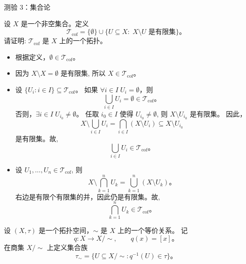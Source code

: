 
\begin{frame}[allowframebreaks]{测验 3：集合论}

\begin{problem}
  设 $X$ 是一个非空集合。定义
  \[
    \mathcal{T}_{\mathrm{cof}} =
    \{\emptyset\} \cup \{U \subseteq X:\;
      X \setminus U \text{ 是有限集}\}\text{。}
  \]
  请证明: $\mathcal{T}_{\mathrm{cof}}$ 是 $X$ 上的一个拓扑。
\end{problem}

\begin{solution}
  \begin{itemize}
    \item 根据定义，$\emptyset\in \mathcal{T}_{\mathrm{cof}}$。
    \item 因为 $X \setminus X = \emptyset$ 是有限集,
      所以 $X \in \mathcal{T}_{\mathrm{cof}}$。
    \item 设 $\{U_i: i \in I\} \subseteq \mathcal{T}_{\mathrm{cof}}$。
      如果 $\forall i \in I\; U_i = \emptyset$，则
      \[
        \bigcup_{i\in I}U_i=\emptyset
          \in \mathcal{T}_{\mathrm{cof}}\text{。}
      \]
      否则，$\exists i \in I\; U_{i_0} \neq \emptyset$。
      任取 $i_{0} \in I$ 使得 $U_{i_0} \neq \emptyset$,
      则 $X \setminus U_{i_0}$ 是有限集。
      因此，
      \[
        X \setminus \bigcup_{i\in I} U_i
        =
        \bigcap_{i\in I}(X\setminus U_i) \subseteq X\setminus U_{i_0}
      \]
      是有限集。故,
      \[
        \bigcup_{i\in I}U_i\in \mathcal{T}_{\mathrm{cof}}\text{。}
      \]
    \item 设 $U_1, \dots, U_n \in \mathcal{T}_{\mathrm{cof}}$, 则
      \[
        X \setminus \bigcap_{k=1}^{n} U_k
        =
        \bigcup_{k=1}^{n}(X\setminus U_k)\text{。}
      \]
      右边是有限个有限集的并，因此仍是有限集。故,
      \[
        \bigcap_{k=1}^{n}U_k\in \mathcal{T}_{\mathrm{cof}}\text{。}
      \]
  \end{itemize}
\end{solution}

\vspace{1ex}
\begin{problem}
  设 $(X, \tau)$ 是一个拓扑空间，$\sim$ 是 $X$ 上的一个等价关系。
  记
  \[
    q: X \to X/\sim, \qquad q(x) = [x]\text{。}
  \]
  在商集 $X/\sim$ 上定义集合族
  \[
    \tau_{\sim} =
    \{U \subseteq X/{\sim}: q^{-1}(U) \in \tau\}\text{。}
  \]


\end{problem}
\end{frame}
